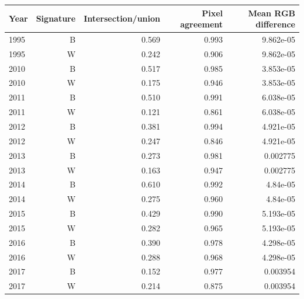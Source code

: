\begin{tabular}{lrrrr}\toprule Year & Signature & Intersection/union & Pixel agreement & Mean RGB difference\\\midrule
1995 & B & 0.569 & 0.993 & 9.862e-05 \\
1995 & W & 0.242 & 0.906 & 9.862e-05 \\
2010 & B & 0.517 & 0.985 & 3.853e-05 \\
2010 & W & 0.175 & 0.946 & 3.853e-05 \\
2011 & B & 0.510 & 0.991 & 6.038e-05 \\
2011 & W & 0.121 & 0.861 & 6.038e-05 \\
2012 & B & 0.381 & 0.994 & 4.921e-05 \\
2012 & W & 0.247 & 0.846 & 4.921e-05 \\
2013 & B & 0.273 & 0.981 & 0.002775 \\
2013 & W & 0.163 & 0.947 & 0.002775 \\
2014 & B & 0.610 & 0.992 & 4.84e-05 \\
2014 & W & 0.275 & 0.960 & 4.84e-05 \\
2015 & B & 0.429 & 0.990 & 5.193e-05 \\
2015 & W & 0.282 & 0.965 & 5.193e-05 \\
2016 & B & 0.390 & 0.978 & 4.298e-05 \\
2016 & W & 0.288 & 0.968 & 4.298e-05 \\
2017 & B & 0.152 & 0.977 & 0.003954 \\
2017 & W & 0.214 & 0.875 & 0.003954 \\
\bottomrule\end{tabular}